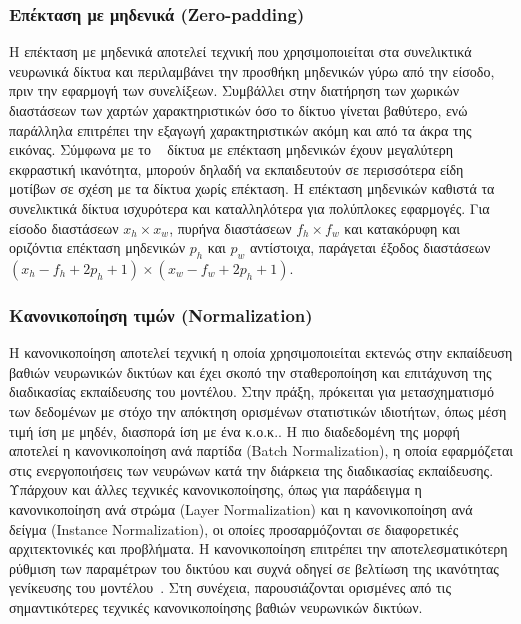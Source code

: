 \documentclass[12pt]{article}
\numberwithin{equation}{section}
\begin{document}
\subsubsection{Επέκταση με μηδενικά (Zero-padding)}

Η επέκταση με μηδενικά αποτελεί τεχνική που χρησιμοποιείται στα συνελικτικά νευρωνικά δίκτυα και περιλαμβάνει την προσθήκη μηδενικών γύρω από την είσοδο, πριν την εφαρμογή των συνελίξεων. Συμβάλλει στην διατήρηση των χωρικών διαστάσεων των χαρτών χαρακτηριστικών όσο το δίκτυο γίνεται βαθύτερο, ενώ παράλληλα επιτρέπει την εξαγωγή χαρακτηριστικών ακόμη και από τα άκρα της εικόνας. Σύμφωνα με το ~\cite{han2023deepconvolutionalneuralnetworks} δίκτυα με επέκταση μηδενικών έχουν μεγαλύτερη εκφραστική ικανότητα, μπορούν δηλαδή να εκπαιδευτούν σε περισσότερα είδη μοτίβων σε σχέση με τα δίκτυα χωρίς επέκταση. H επέκταση μηδενικών καθιστά τα συνελικτικά δίκτυα ισχυρότερα και καταλληλότερα για πολύπλοκες εφαρμογές. Για είσοδο διαστάσεων \(x_h \times x_w\), πυρήνα διαστάσεων \(f_h \times f_w\) και κατακόρυφη και οριζόντια επέκταση μηδενικών \(p_h\) και \(p_w\) αντίστοιχα, παράγεται έξοδος διαστάσεων \((x_h - f_h + 2p_h + 1) \times (x_w - f_w + 2p_h + 1)\). \\

\subsubsection{Κανονικοποίηση τιμών (Normalization)}
 \label{sec:3.4.4}
 
Η κανονικοποίηση αποτελεί τεχνική η οποία χρησιμοποιείται εκτενώς στην εκπαίδευση βαθιών νευρωνικών δικτύων και έχει σκοπό την σταθεροποίηση και επιτάχυνση της διαδικασίας εκπαίδευσης του μοντέλου. Στην πράξη, πρόκειται για μετασχηματισμό των δεδομένων με στόχο την απόκτηση ορισμένων στατιστικών ιδιοτήτων, όπως μέση τιμή ίση με μηδέν, διασπορά ίση με ένα κ.ο.κ.. Η πιο διαδεδομένη της μορφή αποτελεί η κανονικοποίηση ανά παρτίδα (Batch Normalization), η οποία εφαρμόζεται στις ενεργοποιήσεις των νευρώνων κατά την διάρκεια της διαδικασίας εκπαίδευσης. Υπάρχουν και άλλες τεχνικές κανονικοποίησης, όπως για παράδειγμα η κανονικοποίηση ανά στρώμα (Layer Normalization) και η κανονικοποίηση ανά δείγμα (Instance Normalization), οι οποίες προσαρμόζονται σε διαφορετικές αρχιτεκτονικές και προβλήματα. Η κανονικοποίηση επιτρέπει την αποτελεσματικότερη ρύθμιση των παραμέτρων του δικτύου και συχνά οδηγεί σε βελτίωση της ικανότητας γενίκευσης του μοντέλου~\cite{sun2020newinterpretationsnormalizationmethods}. Στη συνέχεια, παρουσιάζονται ορισμένες από τις σημαντικότερες τεχνικές κανονικοποίησης βαθιών νευρωνικών δικτύων.\\
\end{document}
